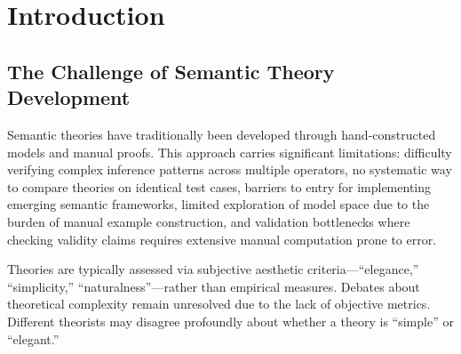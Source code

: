 \documentclass[pdflatex,sn-mathphys-num]{sn-jnl}
\theoremstyle{thmstyleone}
\theoremstyle{thmstyletwo}
\theoremstyle{thmstylethree}
\begin{document}




\maketitle



\section{Introduction}\label{sec:intro}

\subsection{The Challenge of Semantic Theory Development}\label{sec:challenge}

Semantic theories have traditionally been developed through hand-constructed models and manual proofs.
This approach carries significant limitations: difficulty verifying complex inference patterns across multiple operators, no systematic way to compare theories on identical test cases, barriers to entry for implementing emerging semantic frameworks, limited exploration of model space due to the burden of manual example construction, and validation bottlenecks where checking validity claims requires extensive manual computation prone to error.

Theories are typically assessed via subjective aesthetic criteria---``elegance,'' ``simplicity,'' ``naturalness''---rather than empirical measures.
Debates about theoretical complexity remain unresolved due to the lack of objective metrics.
Different theorists may disagree profoundly about whether a theory is ``simple'' or ``elegant.''
\end{document}
